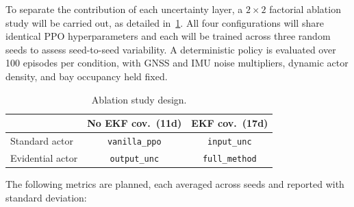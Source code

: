 \documentclass{sig-alternate}
\begin{document}
To separate the contribution of each uncertainty layer, a $2 \times 2$ factorial ablation study will be carried out, as detailed in~\cref{tab:ablation}. All four configurations will share identical PPO hyperparameters and each will be trained across three random seeds to assess seed-to-seed variability. A deterministic policy is evaluated over 100 episodes per condition, with GNSS and IMU noise multipliers, dynamic actor density, and bay occupancy held fixed.

\begin{table}[htbp]
    \centering
    \caption{Ablation study design.\label{tab:ablation}}
    \begin{tabular}{l|cc}
        \toprule
         & No EKF cov.\ (11d) & EKF cov.\ (17d) \\
        \midrule
        Standard actor & \texttt{vanilla\_ppo} & \texttt{input\_unc} \\
        Evidential actor & \texttt{output\_unc} & \texttt{full\_method} \\
        \bottomrule
    \end{tabular}
\end{table}


The following metrics are planned, each averaged across seeds and reported with standard deviation:
\end{document}
